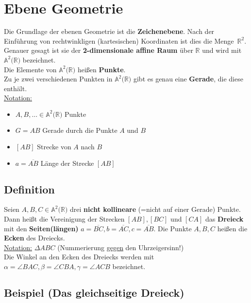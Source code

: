 \section{Ebene Geometrie}
	
	Die Grundlage der ebenen Geometrie ist die \textbf{Zeichenebene}. Nach der Einführung von rechtwinkligen
	(kartesischen) Koordinaten ist dies die Menge~$\mathbb{R}^2$. Genauer gesagt ist sie der 
	\textbf{2-dimensionale affine Raum} über $\mathbb{R}$ und wird mit $\mathbb{A}^2(\mathbb{R)}$ bezeichnet.\\
	Die Elemente von $\mathbb{A}^2(\mathbb{R)}$ heißen \textbf{Punkte}.\\
	Zu je zwei verschiedenen Punkten in	$\mathbb{A}^2(\mathbb{R)}$ gibt es genau eine \textbf{Gerade},
	die diese enthält.\\
	\newline
	\underline{Notation:}
	\begin{itemize}
	\item $A,B,\dots\in\mathbb{A}^2(\mathbb{R)}$ Punkte
	\item $G=AB$ Gerade durch die Punkte $A$ und $B$
	\item $[AB]$ Strecke von $A$ nach $B$
	\item $a=\overline{AB}$ Länge der Strecke $[AB]$
	\end{itemize}
	
	
\subsection{Definition}

	Seien $A,B,C\in\mathbb{A}^2(\mathbb{R)}$ drei \textbf{nicht kollineare} (=nicht auf einer Gerade) Punkte.\\
	Dann heißt die Vereinigung der Strecken $[AB],[BC]$ und $[CA]$ das \textbf{Dreieck} mit den
	\textbf{Seiten(längen)} $a=\overline{BC},b=\overline{AC},c=\overline{AB}$. 
	Die Punkte $A,B,C$ heißen die \textbf{Ecken} des Dreiecks.\\ \newline
	\underline{Notation:} $\Delta ABC$ (Nummerierung \underline{gegen} den Uhrzeigersinn!)\\
	\newline
	Die Winkel an den Ecken des Dreiecks werden mit $\alpha =\angle BAC, \beta =\angle CBA, \gamma =\angle ACB$
	bezeichnet.
	
	
\subsection[Das gleichseitige Dreieck]{Beispiel (Das gleichseitige Dreieck)}

